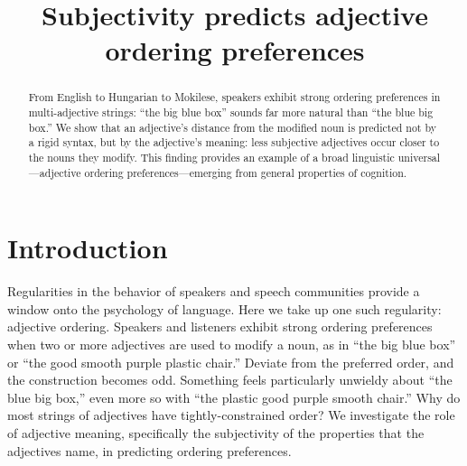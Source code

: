 \documentclass[12pt]{article}
\title{Subjectivity predicts adjective ordering preferences}
\begin{document}
\maketitle

\begin{abstract}
	From English to Hungarian to Mokilese, speakers exhibit strong ordering preferences in multi-adjective strings: ``the big blue box'' sounds far more natural than ``the blue big box.'' We show that an adjective's distance from the modified noun is predicted not by a rigid syntax, but by the adjective's meaning: less subjective adjectives occur closer to the nouns they modify. 
	This finding provides an example of a broad linguistic universal---adjective ordering preferences---emerging from general properties of cognition. 
\end{abstract}

\section{Introduction}

Regularities in the behavior of speakers and speech communities provide a window onto the psychology of language. Here we take up one such regularity: adjective ordering. Speakers and listeners exhibit strong ordering preferences when two or more adjectives are used to modify a noun, as in ``the big blue box'' or ``the good smooth purple plastic chair.'' Deviate from the preferred order, and the construction becomes odd. Something feels particularly unwieldy about ``the blue big box,'' even more so with ``the plastic good purple smooth chair.'' 
Why do most strings of adjectives have tightly-constrained order? 
We investigate the role of adjective meaning, specifically the subjectivity of the properties that the adjectives name, in predicting ordering preferences.
\end{document}
